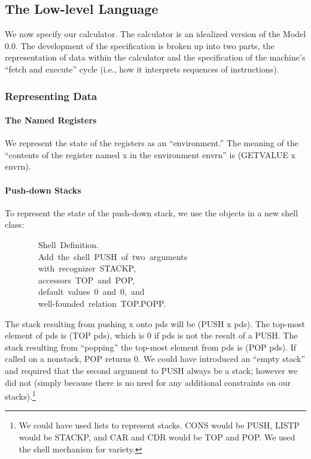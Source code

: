 \documentclass[10pt]{book}
\newenvironment{pubasis}{\begin{flushleft}}{\end{flushleft}}
\begin{document}
\subsection{The Low-level Language}
We now specify our calculator.  The calculator is an
idealized version of the Model 0.0.
The development of the specification
is broken up into two parts, the representation of data within the
calculator
and the specification of the machine's ``fetch and execute'' cycle (i.e.,
how it interprets sequences of instructions).
\subsubsection{Representing Data}
\paragraph{The Named Registers}
We represent the state of the registers as an ``environment.''
The meaning of the ``contents of the
register named x in the environment envrn'' is  (GETVALUE x envrn).

\paragraph{Push-down Stacks}
To represent the state of the push-down stack, we use the objects
in a new shell class:
\begin{pubasis}
~~~~~~~~Shell~Definition.\\
~~~~~~~~Add~the~shell~PUSH~of~two~arguments\\
~~~~~~~~with~recognizer~STACKP,\\
~~~~~~~~accessors~TOP~and~POP,\\
~~~~~~~~default~values~0~and~0,~and\\
~~~~~~~~well-founded~relation~TOP.POPP.\\
\end{pubasis}
The stack resulting from pushing x onto pds will be
(PUSH x pds).  The top-most element of pds is (TOP pds),
which is 0 if pds is not the result of a PUSH.  The stack resulting
from ``popping'' the top-most element from pds is (POP pds).  If
called on a nonstack, POP returns 0.  We could have introduced an
``empty stack'' and required that the second argument to PUSH always be
a stack; however we did not (simply because there is no need for any
additional constraints on our stacks).\footnote{We could have used lists to represent stacks.  CONS would be PUSH, LISTP would be STACKP, and CAR and CDR would be TOP and POP.  We used the shell mechanism for variety.}
\end{document}
